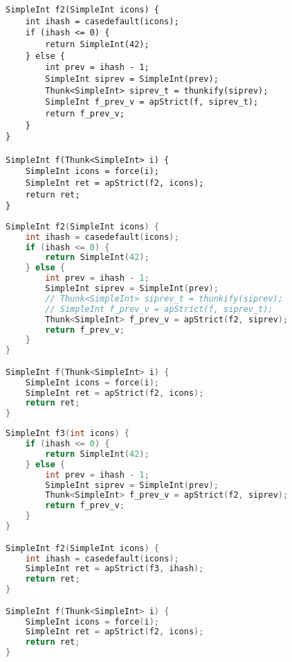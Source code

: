 \documentclass[sigplan,\review anonymous]{acmart}
\newcommand{\lzforce}{\texttt{lz.force}}
\begin{document}
{\footnotesize
\begin{lstlisting}[caption=Step 1: outlining everything after the initial \lzforce into \texttt{f2}]
SimpleInt f2(SimpleInt icons) {
    int ihash = casedefault(icons);
    if (ihash <= 0) {
        return SimpleInt(42);
    } else {
        int prev = ihash - 1;
        SimpleInt siprev = SimpleInt(prev);
        Thunk<SimpleInt> siprev_t = thunkify(siprev);
        SimpleInt f_prev_v = apStrict(f, siprev_t);
        return f_prev_v;
    }
}

SimpleInt f(Thunk<SimpleInt> i) {
    SimpleInt icons = force(i);
    SimpleInt ret = apStrict(f2, icons);
    return ret;
}
\end{lstlisting}
}

\begin{lstlisting}[language=c++, caption=Step 2: Removing the strict application]
SimpleInt f2(SimpleInt icons) {
    int ihash = casedefault(icons);
    if (ihash <= 0) {
        return SimpleInt(42);
    } else {
        int prev = ihash - 1;
        SimpleInt siprev = SimpleInt(prev);
        // Thunk<SimpleInt> siprev_t = thunkify(siprev);
        // SimpleInt f_prev_v = apStrict(f, siprev_t);
        Thunk<SimpleInt> f_prev_v = apStrict(f2, siprev);
        return f_prev_v;
    }
}

SimpleInt f(Thunk<SimpleInt> i) {
    SimpleInt icons = force(i);
    SimpleInt ret = apStrict(f2, icons);
    return ret;
}
\end{lstlisting}

{\footnotesize
\begin{lstlisting}[language=c++, caption=Step 3: outline everything after casedefault into f3]
SimpleInt f3(int icons) {
    if (ihash <= 0) {
        return SimpleInt(42);
    } else {
        int prev = ihash - 1;
        SimpleInt siprev = SimpleInt(prev);
        Thunk<SimpleInt> f_prev_v = apStrict(f2, siprev);
        return f_prev_v;
    }
}

SimpleInt f2(SimpleInt icons) {
    int ihash = casedefault(icons);
    SimpleInt ret = apStrict(f3, ihash);
    return ret;
}

SimpleInt f(Thunk<SimpleInt> i) {
    SimpleInt icons = force(i);
    SimpleInt ret = apStrict(f2, icons);
    return ret;
}
\end{lstlisting}
}
\end{document}
